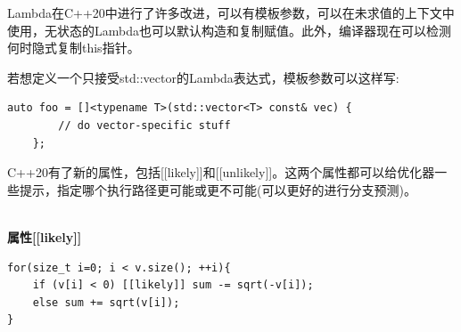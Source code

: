 Lambda在C++20中进行了许多改进，可以有模板参数，可以在未求值的上下文中使用，无状态的Lambda也可以默认构造和复制赋值。此外，编译器现在可以检测何时隐式复制this指针。

若想定义一个只接受std::vector的Lambda表达式，模板参数可以这样写:

\begin{lstlisting}[style=styleCXX]
auto foo = []<typename T>(std::vector<T> const& vec) {
		// do vector-specific stuff
	};
\end{lstlisting}


C++20有了新的属性，包括[[likely]]和[[unlikely]]。这两个属性都可以给优化器一些提示，指定哪个执行路径更可能或更不可能(可以更好的进行分支预测)。

\hspace*{\fill} \\ %
\noindent
\textbf{属性[[likely]]}
\begin{lstlisting}[style=styleCXX]
for(size_t i=0; i < v.size(); ++i){
	if (v[i] < 0) [[likely]] sum -= sqrt(-v[i]);
	else sum += sqrt(v[i]);
}
\end{lstlisting}